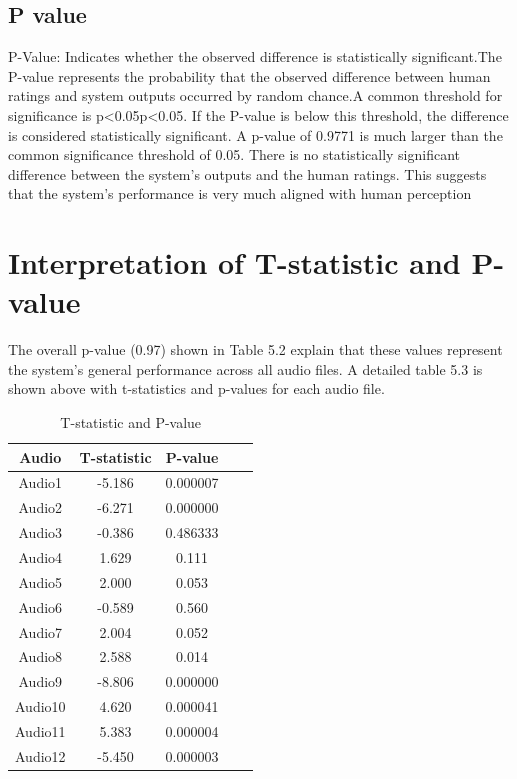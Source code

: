 \documentclass[Arial,12pt,openright,twoside]{book}
\begin{document}
\subsection{P value }
P-Value: Indicates whether the observed difference is statistically significant.The P-value represents the probability that the observed difference between human ratings and system outputs occurred by random chance.A common threshold for significance is p<0.05p<0.05. If the P-value is below this threshold, the difference is considered statistically significant. A p-value of 0.9771 is much larger than the common significance threshold of 0.05.  There is no statistically significant difference between the system's outputs and the human ratings. This suggests that the system's performance is very much aligned with human perception
\section{Interpretation of T-statistic and P-value }
The overall p-value (0.97) shown in Table 5.2 explain that these values represent the system's general performance across all audio files. A detailed table 5.3 is shown above with t-statistics and p-values for each audio file.
\vspace{10pt} %
\begin{table}[H] %
\centering
\caption{T-statistic and P-value}
\label{tab:correlation_table} %
 \begin{tabular}{|c|c|c|c|c|}
        \hline
        Audio  & T-statistic & P-value \\ \hline
        Audio1 & -5.186 & 0.000007\\ \hline
        Audio2 &  -6.271 & 0.000000\\ \hline
        Audio3 & -0.386 & 0.486333 \\ \hline
        Audio4 &  1.629 & 0.111\\ \hline
        Audio5 &  2.000& 0.053 \\ \hline
        Audio6 &   -0.589 &  0.560 \\ \hline
        Audio7 & 2.004 & 0.052  \\ \hline
        Audio8 &  2.588 &  0.014  \\ \hline
        Audio9 &  -8.806 & 0.000000 \\ \hline
        Audio10 &  4.620 &  0.000041 \\ \hline
        Audio11 &  5.383 & 0.000004\\ \hline
        Audio12 & -5.450 & 0.000003\\ \hline
    \end{tabular}%
   \end{table}
\end{document}
